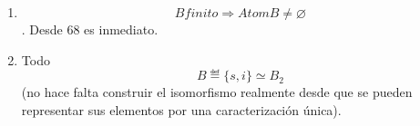 \begin{enumerate}
\begin{enumerate}
\begin{enumerate}
      \begin{enumerate}
      \def\labelenumiv{\arabic{enumiv}.}
      \tightlist
      \item
        \[{\langle{P, \supseteq}\rangle}\mathit{es}\mathit{un}\mathit{orden}\mathit{total}\]
      \item
        \[\forall X,{Y \in P}{X \neq Y}\Rightarrow{{X \supset {Y \vee Y}} \supset X}\]
      \item
        \[\forall X,{Y \in P}{X \neq Y}\Rightarrow{\left( {\left( {Y \supset X} \right) \vee \left( {Y \supset X} \right)} \right) \land \left( {\left( {{Y \cap X} = X} \right) \vee \left( {{Y \cap X} = Y} \right)} \right)}\]
      \item
        \[\forall X,{Y \in P}{X \neq Y}\Rightarrow{\left( {\left( {{Y \cap X} = X} \right) \vee \left( {{Y \cap X} = Y} \right)} \right) \land \left( {{X \neq {{\{ 0\}} \land Y}} \neq {\{ 0\}}} \right)}\]
      \item
        \[\forall X,{Y \in P}\left( {X \neq Y} \right)\Rightarrow\left( {{Y \cap X} \neq {\{ 0\}}} \right)\]
      \item
        \[\underset{X \in P}{\cap}{X \neq {{\{ 0\}} \land \underset{X \in P}{\cap}}}{X \supset {\{ 0\}}}\]
      \item
        \[\underset{Y \in P}{\cap}Y \supsetneq {\{ 0\}}\]
      \item
        \[\underset{Y \in P}{\cap}{Y \supseteq {\{{0,x}\}}}\]
      \item
        \[\underset{Y \in P}{\cap}{Y \supseteq {\lbrack{x,0}\rbrack}_{B}}\]
      \item
        \[\underset{Y \in P}{\cap}{{Y \supseteq {\lbrack{x,0}\rbrack}_{B}} \supseteq {\{{0,x}\}}}\]
      \item
        \[{\lbrack{x,0}\rbrack}_{B} \in P\]
      \item
        \[\exists{X \in P}\exists{x \in X}{\underset{Y \in P}{\cap}{Y = {\lbrack{x,0}\rbrack}_{B}}}\]
      \item
        \[\exists!{x \in B}{\underset{Y \in P}{\cap}{Y = {\lbrack{x,0}\rbrack}_{B}}}\]
      \item
        \[\exists{x \in {\underset{Y \in P}{\cap}Y{{\lbrack{x,0}\rbrack}_{B} = {\{{0,x}\}}}}}\]
      \item
        \[\exists{x \in {\underset{Y \in P}{\cap}Y\forall{X \in P}{{X \supseteq {\lbrack{x,0}\rbrack}_{B}} = {\{{0,x}\}}}}}\]
      \item
        \[\forall{P \subset \left\lbrack B \right)}{\langle{P, \supseteq}\rangle}\mathit{orden}\mathit{total}\Rightarrow\exists!{x \in \underset{X \in P}{\cap}}X\mathsf{\mathit{atom}}_{B}{(x)}\]
      \end{enumerate}
    \item
      \[B\mathit{finito}\Rightarrow\mathit{Atom}{B \neq \varnothing}\].
      Desde 68 es inmediato.
    \item
      Todo \[B ≝ {{\{{s,i}\}} \simeq B_{2}}\](no hace falta construir el
      isomorfismo realmente desde que se pueden representar sus
      elementos por una caracterización única).


\end{enumerate}
\end{enumerate}
\end{enumerate}
